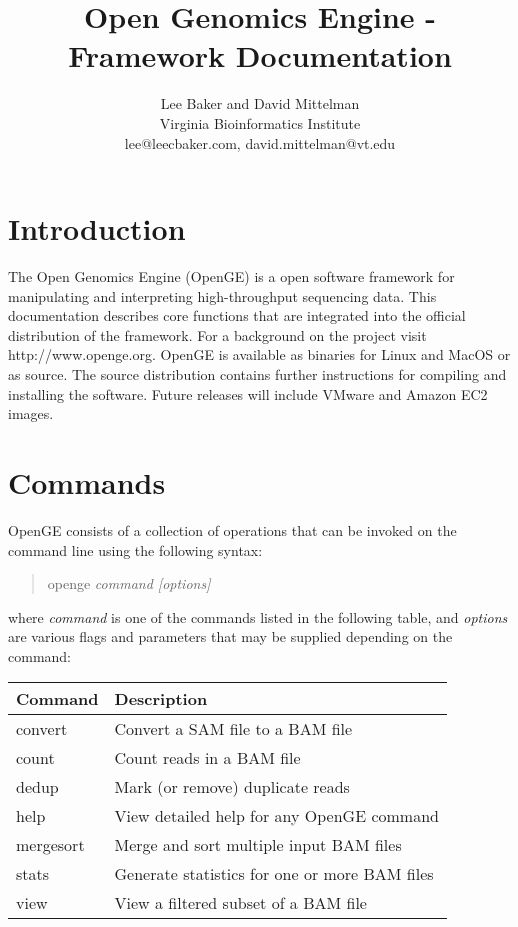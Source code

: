 \documentclass[11pt]{article}
\newcommand {\cmd}[1] {\begin{quote}#1\end{quote}}
\begin{document}
\title{Open Genomics Engine - Framework Documentation}
\author{Lee Baker and David Mittelman\\
Virginia Bioinformatics Institute \\
lee@leecbaker.com, david.mittelman@vt.edu}
\maketitle

\section {Introduction}
The Open Genomics Engine (OpenGE) is a open software framework for manipulating and interpreting high-throughput sequencing data. This documentation describes core functions that are integrated into the official distribution of the framework. For a background on the project visit http://www.openge.org. OpenGE is available as binaries for Linux and MacOS or as source. The source distribution contains further instructions for compiling and installing the software. Future releases will include VMware and Amazon EC2 images.
\section {Commands}
OpenGE consists of a collection of operations that can be invoked on the command line using the following syntax:

\cmd{openge \textit{command [options]}}

where \textit{command} is one of the commands listed in the following table, and \textit{options} are various flags and parameters that may be supplied depending on the command:

\begin{center}
\begin{tabular}{lp{3.5in}}
\hline
Command&Description\\ \hline
convert&Convert a SAM file to a BAM file\\
count&Count reads in a BAM file\\
dedup&Mark (or remove) duplicate reads\\
help&View detailed help for any OpenGE command\\
mergesort&Merge and sort multiple input BAM files\\
stats&Generate statistics for one or more BAM files\\
view&View a filtered subset of a BAM file\\
\end{tabular}
\end{center}
\end{document}
